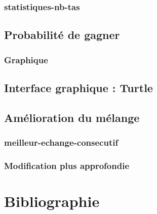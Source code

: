 \documentclass[french, titlepage]{article}
\begin{document}
        \subsubsection{\ttfamily statistiques-nb-tas}
    \subsection{Probabilité de gagner}
        \subsubsection{Graphique}
    \subsection{Interface graphique : Turtle}
    \subsection{Amélioration du mélange}
        \subsubsection{\ttfamily meilleur-echange-consecutif}
        \subsubsection{Modification plus approfondie}
        

\section{Bibliographie}
\end{document}

